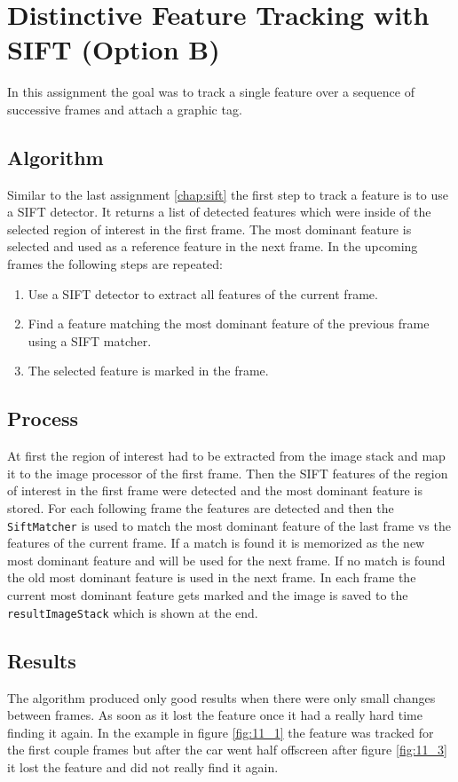 \chapter{Distinctive Feature Tracking with SIFT (Option B)}

In this assignment the goal was to track a single feature over a sequence of successive frames and attach a graphic tag.

\section{Algorithm}
Similar to the last assignment \ref{chap:sift} the first step to track a feature is to use a SIFT detector. It returns a list of detected features which were inside of the selected region of interest in the first frame. The most dominant feature is selected and used as a reference feature in the next frame. In the upcoming frames the following steps are repeated:
\begin{enumerate}
	\item Use a SIFT detector to extract all features of the current frame.
	\item Find a feature matching the most dominant feature of the previous frame using a SIFT matcher.
	\item The selected feature is marked in the frame.
\end{enumerate}

\section{Process}
At first the region of interest had to be extracted from the image stack and map it to the image processor of the first frame. Then the SIFT features of the region of interest in the first frame were detected and the most dominant feature is stored. For each following frame the features are detected and then the \texttt{SiftMatcher} is used to match the most dominant feature of the last frame vs the features of the current frame. If a match is found it is memorized as the new most dominant feature and will be used for the next frame. If no match is found the old most dominant feature is used in the next frame. In each frame the current most dominant feature gets marked and the image is saved to the \texttt{resultImageStack} which is shown at the end.

\section{Results}
The algorithm produced only good results when there were only small changes between frames. As soon as it lost the feature once it had a really hard time finding it again. In the example in figure \ref{fig:11_1} the feature was tracked for the first couple frames but after the car went half offscreen after figure \ref{fig:11_3} it lost the feature and did not really find it again.

